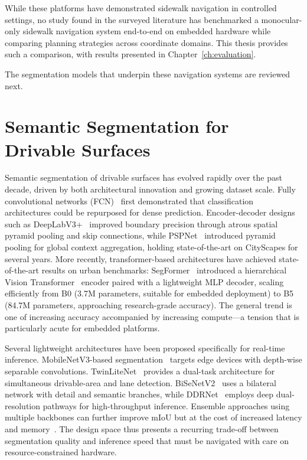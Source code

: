 \documentclass[12pt,letterpaper,oneside]{report}
\begin{document}
While these platforms have demonstrated sidewalk navigation in controlled settings, no study found in the surveyed literature has benchmarked a monocular-only sidewalk navigation system end-to-end on embedded hardware while comparing planning strategies across coordinate domains. This thesis provides such a comparison, with results presented in Chapter~\ref{ch:evaluation}.

The segmentation models that underpin these navigation systems are reviewed next.


\section{Semantic Segmentation for Drivable Surfaces}
\label{sec:lit_segmentation}

Semantic segmentation of drivable surfaces has evolved rapidly over the past decade, driven by both architectural innovation and growing dataset scale. Fully convolutional networks (FCN)~\cite{fcn2015} first demonstrated that classification architectures could be repurposed for dense prediction. Encoder-decoder designs such as DeepLabV3+~\cite{deeplabv3plus} improved boundary precision through atrous spatial pyramid pooling and skip connections, while PSPNet~\cite{pspnet} introduced pyramid pooling for global context aggregation, holding state-of-the-art on CityScapes for several years. More recently, transformer-based architectures have achieved state-of-the-art results on urban benchmarks: SegFormer~\cite{segformer} introduced a hierarchical Vision Transformer~\cite{dosovitskiy2021vit} encoder paired with a lightweight MLP decoder, scaling efficiently from B0 (3.7M parameters, suitable for embedded deployment) to B5 (84.7M parameters, approaching research-grade accuracy). The general trend is one of increasing accuracy accompanied by increasing compute---a tension that is particularly acute for embedded platforms.

Several lightweight architectures have been proposed specifically for real-time inference. MobileNetV3-based segmentation~\cite{edge_optimized_seg} targets edge devices with depth-wise separable convolutions. TwinLiteNet~\cite{twinlitenet2024} provides a dual-task architecture for simultaneous drivable-area and lane detection. BiSeNetV2~\cite{bisenetv2} uses a bilateral network with detail and semantic branches, while DDRNet~\cite{ddrnet} employs deep dual-resolution pathways for high-throughput inference. Ensemble approaches using multiple backbones can further improve mIoU but at the cost of increased latency and memory~\cite{shihab2024}. The design space thus presents a recurring trade-off between segmentation quality and inference speed that must be navigated with care on resource-constrained hardware.
\end{document}
